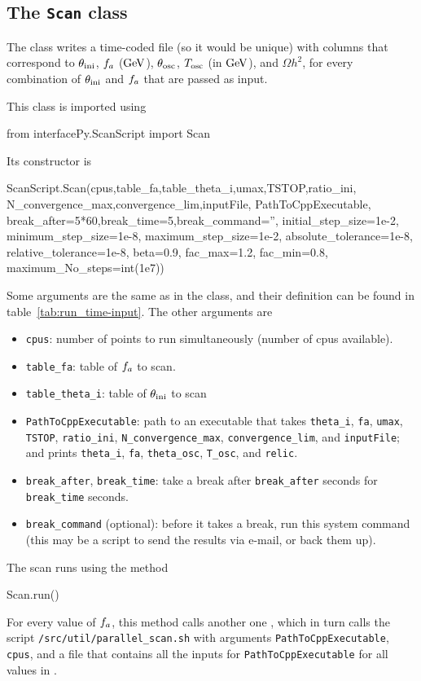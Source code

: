 \documentclass[11pt,a4paper]{article}
\begin{document}
\subsection{The {\tt Scan} class}\label{app:Scan}
%
The  class writes a time-coded file (so it would be unique) with columns that correspond to $\theta_{\rm ini}{}$, $f_{a}{}$ (${\rm GeV}$), $\theta_{\rm osc}{}$, $T_{\rm osc}{}$ (in ${\rm GeV}$), and $\Omega h^2$, for every combination of $\theta_{\rm ini}{}$ and $f_{a}{}$ that are passed as input. 

This class is imported using 
%
\begin{py}
	from interfacePy.ScanScript import Scan
\end{py}

Its constructor is
%
\begin{py}
	ScanScript.Scan(cpus,table_fa,table_theta_i,umax,TSTOP,ratio_ini,
					N_convergence_max,convergence_lim,inputFile,
					PathToCppExecutable, break_after=5*60,break_time=5,break_command='',
					initial_step_size=1e-2, minimum_step_size=1e-8, maximum_step_size=1e-2, 
					absolute_tolerance=1e-8, relative_tolerance=1e-8,
					beta=0.9, fac_max=1.2, fac_min=0.8, maximum_No_steps=int(1e7))
\end{py}
%
Some arguments are the same as in the  class, and their definition can be found in table~\ref{tab:run_time-input}. The other arguments are
%
\begin{itemize}
        \item {\tt cpus}: number of points to run simultaneously (number of cpus available). 
		\item {\tt table\_fa}: table of $f_{a}{}$ to scan.
		\item {\tt table\_theta\_i}: table of $\theta_{\rm ini}{}$ to scan
        \item {\tt PathToCppExecutable}: path to an executable that takes {\tt theta\_i},  {\tt fa},  {\tt umax},  {\tt TSTOP},  {\tt ratio\_ini}, {\tt N\_convergence\_max}, {\tt convergence\_lim}, and  {\tt inputFile}; and prints {\tt theta\_i}, {\tt fa}, {\tt theta\_osc}, {\tt T\_osc}, and {\tt relic}.
		\item {\tt break\_after}, {\tt break\_time}: take a break after {\tt break\_after} seconds for {\tt break\_time} seconds.
		\item {\tt break\_command} (optional): before it takes a break, run this system command (this may be a script to send the results
		via e-mail, or back them up).
\end{itemize}
%
The scan runs using the method
%
\begin{py}
	Scan.run()
\end{py} 
%
For every value of $f_{a}{}$, this method calls another one , which in turn calls the  script {\tt \mimes/src/util/parallel\_scan.sh} with arguments {\tt PathToCppExecutable}, {\tt cpus}, and a file that contains all the inputs for {\tt PathToCppExecutable} for all values in . 
\end{document}
